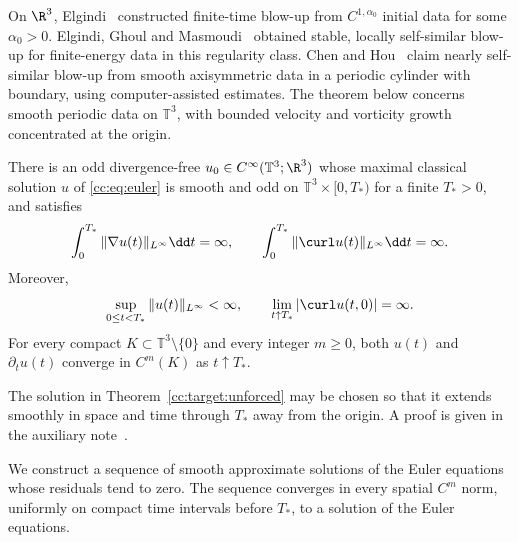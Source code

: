 On $\R^3$, Elgindi~\cite{ElgindiSingularity} constructed finite-time
blow-up from $C^{1,\alpha_0}$ initial data for some $\alpha_0>0$.
Elgindi, Ghoul and Masmoudi~\cite{ElgindiGhoulMasmoudi} obtained stable,
locally self-similar blow-up for finite-energy data in this regularity class.
Chen and Hou~\cite{ChenHouSmoothI,ChenHouSmoothII} claim nearly self-similar
blow-up from smooth axisymmetric data in a periodic cylinder with boundary,
using computer-assisted estimates. The theorem below concerns smooth
periodic data on $\mathbb T^3$, with bounded velocity and vorticity growth
concentrated at the origin.

\begin{theorem}\label{cc:target:unforced}
There is an odd divergence-free
$u_0\in C^\infty(\mathbb T^3;\R^3)$ whose maximal classical solution $u$
of \eqref{cc:eq:euler} is smooth and odd on
$\mathbb T^3\times[0,T_*)$ for a finite $T_*>0$, and satisfies
\begin{equation}\label{cc:uf:eq:main-breakdown}
 \int_0^{T_*}\|\nabla u(t)\|_{L^\infty}\dd t=\infty,
 \qquad
 \int_0^{T_*}\|\curl u(t)\|_{L^\infty}\dd t=\infty.
\end{equation}
Moreover,
\begin{equation}\label{cc:uf:eq:main-terminal}
 \sup_{0\le t<T_*}\|u(t)\|_{L^\infty}<\infty,
 \qquad \lim_{t\uparrow T_*}|\curl u(t,0)|=\infty.
\end{equation}
For every compact $K\subset\mathbb T^3\setminus\{0\}$ and every integer
$m\ge0$, both $u(t)$ and $\partial_tu(t)$ converge in $C^m(K)$ as
$t\uparrow T_*$.
\end{theorem}

\begin{remark}
The solution in Theorem~\ref{cc:target:unforced} may be chosen so that it
extends smoothly in space and time through $T_*$ away from the origin.
A proof is given in the auxiliary note~\cite{TerminalSmoothness}.
\end{remark}

We construct a sequence of smooth approximate solutions of the Euler
equations whose residuals tend to zero. The sequence converges in every
spatial $C^m$ norm, uniformly on compact time intervals before $T_*$, to
a solution of the Euler equations.

